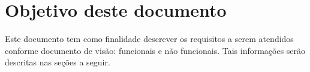 \documentclass[
	12pt,				%
	openright,			%
	twoside,			%
	a4paper,			%
	english,			%
	french,				%
	spanish,			%
	brazil,				%
	]{abntex2}
\begin{document}
\textual

\chapter{Objetivo deste documento}
Este documento tem como finalidade descrever os requisitos a serem atendidos conforme documento de visão: funcionais e não funcionais. Tais informações serão descritas nas seções a seguir.
\end{document}
